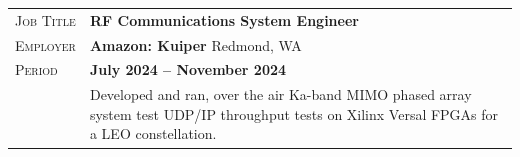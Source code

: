 \documentclass[a4paper, oneside, final]{scrartcl}
\newcommand{\gray}{\rowcolor[gray]{.90}} %
\begin{document}
\begin{center}
\begin{tabularx}{0.97\linewidth}{>{\raggedleft\scshape}p{2cm}X}
\gray Job Title & \textbf{RF Communications System Engineer}\\
\gray Employer & \textbf{Amazon: Kuiper} \hfill Redmond, WA\\
\gray Period & \textbf{July 2024 -- November 2024}\\
&
\vspace{-0.15 cm}
Developed and ran, over the air Ka-band MIMO phased array system test UDP/IP throughput tests on Xilinx Versal FPGAs for a LEO constellation.  
\newline
\end{tabularx}


\end{center}
\end{document}
